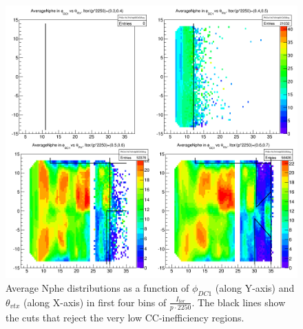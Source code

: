 \begin{figure}[H]%
\centering
\leavevmode \includegraphics[width=1.1\textwidth]{figuresEG4/NewP2/FidCuts/moreFiducialCutsMoreInversePBinsEbi2first4Bins.png}
\caption[Fiducial cuts (first 4 bins)]{Average Nphe distributions as a function of $\phi_{DC1}$ (along Y-axis) and $\theta_{vtx}$ (along X-axis) in first four bins of $\frac{I_{tor}}{p \cdot 2250}$. The black lines show the cuts that reject the very low CC-inefficiency regions.}
\label{figFidAvgNph1}
\end{figure}



